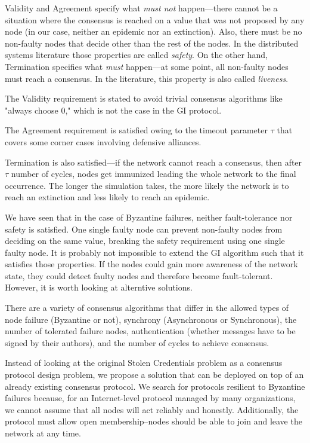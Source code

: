 Validity and Agreement specify what \textit{must not} happen––there cannot be a situation where the consensus is reached on a value that was not proposed by any node (in our case, neither an epidemic nor an extinction). Also, there must be no non-faulty nodes that decide other than the rest of the nodes. In the distributed systems literature \cite{lamport1977proving} those properties are called \textit{safety}. On the other hand, Termination specifies what \textit{must} happen––at some point, all non-faulty nodes must reach a consensus. In the literature, this property is also called \textit{liveness}.

The Validity requirement is stated to avoid trivial consensus algorithms like "always choose 0," which is not the case in the GI protocol.

The Agreement requirement is satisfied owing to the timeout parameter $\tau$ that covers some corner cases involving defensive alliances.

Termination is also satisfied––if the network cannot reach a consensus, then after $\tau$ number of cycles, nodes get immunized leading the whole network to the final occurrence. The longer the simulation takes, the more likely the network is to reach an extinction and less likely to reach an epidemic.

We have seen that in the case of Byzantine failures,  neither fault-tolerance nor safety is satisfied. One single faulty node can prevent non-faulty nodes from deciding on the same value, breaking the safety requirement using one single faulty node.
It is probably not impossible to extend the GI algorithm such that it satisfies those properties. If the nodes could gain more awareness of the network state, they could detect faulty nodes and therefore become fault-tolerant. However, it is worth looking at alterntive solutions. 

There are a variety of  consensus algorithms that differ in the allowed types of node failure (Byzantine or not), synchrony (Asynchronous or Synchronous), the number of tolerated failure nodes, authentication (whether messages have to be signed by their authors), and the number of cycles to achieve consensus. 

Instead of looking at the original Stolen Credentials problem as a consensus protocol design problem, we propose a solution that can be deployed on top of an already existing consensus protocol. We search for protocols resilient to Byzantine failures because, for an Internet-level protocol managed by many organizations, we cannot assume that all nodes will act reliably and honestly. Additionally, the protocol must allow open membership--nodes should be able to join and leave the network at any time. 
